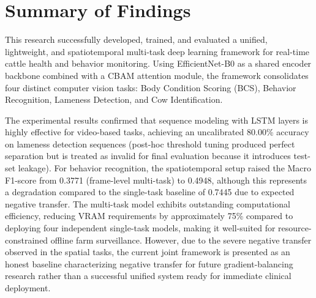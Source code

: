 \section{Summary of Findings}
This research successfully developed, trained, and evaluated a unified, lightweight, and spatiotemporal multi-task deep learning framework for real-time cattle health and behavior monitoring. Using EfficientNet-B0 as a shared encoder backbone combined with a CBAM attention module, the framework consolidates four distinct computer vision tasks: Body Condition Scoring (BCS), Behavior Recognition, Lameness Detection, and Cow Identification. 

The experimental results confirmed that sequence modeling with LSTM layers is highly effective for video-based tasks, achieving an uncalibrated 80.00\% accuracy on lameness detection sequences (post-hoc threshold tuning produced perfect separation but is treated as invalid for final evaluation because it introduces test-set leakage). For behavior recognition, the spatiotemporal setup raised the Macro F1-score from 0.3771 (frame-level multi-task) to 0.4948, although this represents a degradation compared to the single-task baseline of 0.7445 due to expected negative transfer. The multi-task model exhibits outstanding computational efficiency, reducing VRAM requirements by approximately 75\% compared to deploying four independent single-task models, making it well-suited for resource-constrained offline farm surveillance. However, due to the severe negative transfer observed in the spatial tasks, the current joint framework is presented as an honest baseline characterizing negative transfer for future gradient-balancing research rather than a successful unified system ready for immediate clinical deployment.

